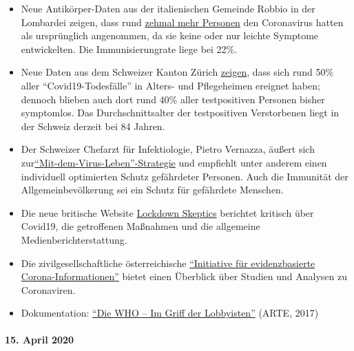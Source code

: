 \begin{itemize}
{  ``Schmierinfektionen''} in Supermärkten, Restaurants oder
  Frisiersalons nachgewiesen werden konnte.
\item
  Neue Antikörper-Daten aus der italienischen Gemeinde Robbio in der
  Lombardei zeigen, dass rund
  \href{https://www.tgcom24.mediaset.it/cronaca/a-robbio-pv-il-22-ha-o-ha-avuto-il-coronavirus-ok-del-sindaco-ai-test-per-tutti_17285128-202002a.shtml}{zehmal
  mehr Personen} den Coronavirus hatten als ursprünglich angenommen, da
  sie keine oder nur leichte Symptome entwickelten. Die
  Immunisierungrate liege bei 22\%.
\item
  Neue Daten aus dem Schweizer Kanton Zürich
  \href{https://www.nzz.ch/zuerich/coronavirus-zuerich-aendert-nun-das-testregime-in-heimenauch-viele-aeltere-covid-19-infizierte-entwickeln-keine-symptome-zuerich-aendert-nun-das-testregime-in-heimen-ld.1552089}{zeigen},
  dass sich rund 50\% aller ``Covid19-Todesfälle'' in Alters- und
  Pflegeheimen ereignet haben; dennoch blieben auch dort rund 40\% aller
  testpositiven Personen bisher symptomlos. Das Durchschnittsalter der
  testpositiven Verstorbenen liegt in der Schweiz derzeit bei 84 Jahren.
\item
  Der Schweizer Chefarzt für Infektiologie, Pietro Vernazza, äußert sich
  zur\href{https://infekt.ch/2020/04/exitstrategie-lockdown/}{``Mit-dem-Virus-Leben''-Strategie}
  und empfiehlt unter anderem einen individuell optimierten Schutz
  gefährdeter Personen. Auch die Immunität der Allgemeinbevölkerung sei
  ein Schutz für gefährdete Menschen.
\item
  Die neue britische Website
  \href{https://lockdownsceptics.org/}{Lockdown Skeptics} berichtet
  kritisch über Covid19, die getroffenen Maßnahmen und die allgemeine
  Medienberichterstattung.
\item
  Die zivilgesellschaftliche österreichische
  \href{https://www.initiative-corona.info/}{``Initiative für
  evidenzbasierte Corona-Informationen''} bietet einen Überblick über
  Studien und Analysen zu Coronaviren.
\item
  Dokumentation:
  \href{https://www.youtube.com/watch?v=dYlia_fQOLk}{``Die WHO -- Im
  Griff der Lobbyisten''} (ARTE, 2017)
\end{itemize}

\hypertarget{15-april-2020}{%
\paragraph{15. April 2020}\label{15-april-2020}}

